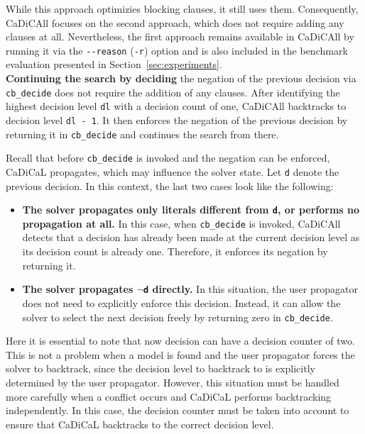 \documentclass[12pt,a4paper]{article}
\begin{document}
While this approach optimizies blocking clauses, it still uses them. Consequently, CaDiCAll focuses on the second approach, which does not require adding any clauses at all. Nevertheless, the first approach remains available in CaDiCAll by running it via the \verb|--reason| (\verb|-r|) option and is also included in the benchmark evaluation presented in Section~\ref{sec:experiments}. \\

\noindent
\textbf{Continuing the search by deciding} the negation of the previous decision via \verb|cb_decide| does not require the addition of any clauses. After identifying the highest decision level \verb|dl| with a decision count of one, CaDiCAll backtracks to decision level \verb|dl - 1|. It then enforces the negation of the previous decision by returning it in \verb|cb_decide| and continues the search from there.

Recall that before \verb|cb_decide| is invoked and the negation can be enforced, CaDiCaL propagates, which may influence the solver state. Let \verb|d| denote the previous decision. In this context, the last two cases look like the following:

\begin{itemize}

\item \textbf{The solver propagates only literals different from \texttt{d}, or performs no propagation at all.} In this case, when \verb|cb_decide| is invoked, CaDiCAll detects that a decision has already been made at the current decision level as its decision count is already one. Therefore, it enforces its negation by returning it.

\item \textbf{The solver propagates \texttt{$\lnot$d} directly.} In this situation, the user propagator does not need to explicitly enforce this decision. Instead, it can allow the solver to select the next decision freely by returning zero in \verb|cb_decide|.

\end{itemize}

Here it is essential to note that now decision can have a decision counter of two. This is not a problem when a model is found and the user propagator forces the solver to backtrack, since the decision level to backtrack to is explicitly determined by the user propagator. However, this situation must be handled more carefully when a conflict occurs and CaDiCaL performs backtracking independently. In this case, the decision counter must be taken into account to ensure that CaDiCaL backtracks to the correct decision level.
\end{document}

